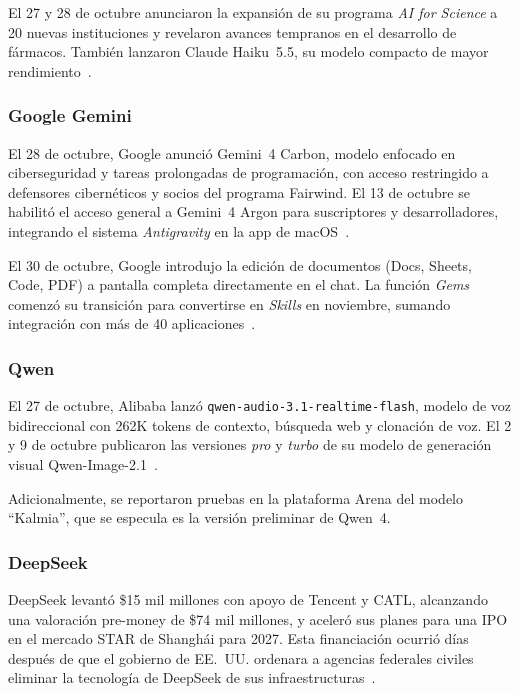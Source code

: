\documentclass[conference]{IEEEtran}
\begin{document}
El 27 y 28 de octubre anunciaron la expansión de su programa
\textit{AI for Science} a 20 nuevas instituciones y revelaron avances
tempranos en el desarrollo de fármacos. También lanzaron Claude
Haiku~5.5, su modelo compacto de mayor rendimiento~\cite{claudehaiku55}.

\subsubsection{Google Gemini}

El 28 de octubre, Google anunció Gemini~4 Carbon, modelo enfocado en
ciberseguridad y tareas prolongadas de programación, con acceso
restringido a defensores cibernéticos y socios del programa Fairwind.
El 13 de octubre se habilitó el acceso general a Gemini~4 Argon para
suscriptores y desarrolladores, integrando el sistema \textit{Antigravity}
en la app de macOS~\cite{gemini4carbon}.

El 30 de octubre, Google introdujo la edición de documentos (Docs,
Sheets, Code, PDF) a pantalla completa directamente en el chat. La
función \textit{Gems} comenzó su transición para convertirse en
\textit{Skills} en noviembre, sumando integración con más de 40
aplicaciones~\cite{geminieco}.

\subsubsection{Qwen}

El 27 de octubre, Alibaba lanzó \texttt{qwen-audio-3.1-realtime-flash},
modelo de voz bidireccional con 262K tokens de contexto, búsqueda web
y clonación de voz. El 2 y 9 de octubre publicaron las versiones
\textit{pro} y \textit{turbo} de su modelo de generación visual
Qwen-Image-2.1~\cite{qwenaudio}.

Adicionalmente, se reportaron pruebas en la plataforma Arena del modelo
``Kalmia'', que se especula es la versión preliminar de Qwen~4.

\subsubsection{DeepSeek}

DeepSeek levantó \$15 mil millones con apoyo de Tencent y CATL,
alcanzando una valoración pre-money de \$74 mil millones, y aceleró
sus planes para una IPO en el mercado STAR de Shanghái para 2027.
Esta financiación ocurrió días después de que el gobierno de EE.~UU.
ordenara a agencias federales civiles eliminar la tecnología de DeepSeek
de sus infraestructuras~\cite{deepseekfunding}.
\end{document}
